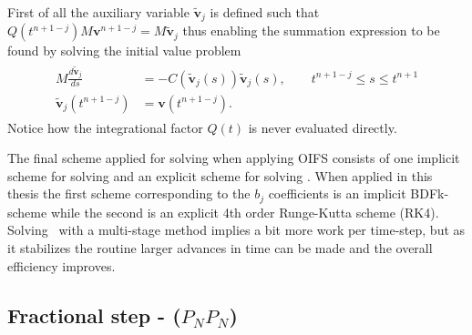 First of all the auxiliary variable $\tilde{\mathbf{v}}_j$ is defined such that $Q(t^{n+1-j})M\mathbf{v}^{n+1-j} = M\tilde{\mathbf{v}}_j$
thus enabling the summation expression to be found by solving the initial value problem 
\begin{align}
    \begin{split}
    M\frac{d\tilde{\mathbf{v}}_j}{ds} &= -C(\tilde{\mathbf{v}}_j(s))\tilde{\mathbf{v}}_j(s) , \qquad t^{n+1-j}\leq s\leq t^{n+1}\\
    \tilde{\mathbf{v}}_j(t^{n+1-j}) &= \mathbf{v}(t^{n+1-j}).
    \end{split}
    \label{eq:IVP}
\end{align}
Notice how the integrational factor $Q(t)$ is never evaluated directly.

The final scheme applied for solving  when applying OIFS consists of one implicit scheme for 
solving  and an explicit scheme for solving . When applied in this thesis the 
first scheme corresponding to the $b_j$ coefficients is an implicit BDFk-scheme while the second is an explicit 4th order Runge-Kutta scheme (RK4). 
Solving~ with a multi-stage method implies a bit more work per time-step, but as it stabilizes the routine larger advances in 
time can be made and the overall efficiency improves.


\subsection{Fractional step - ($P_NP_N$)} 
\label{fracstep}


